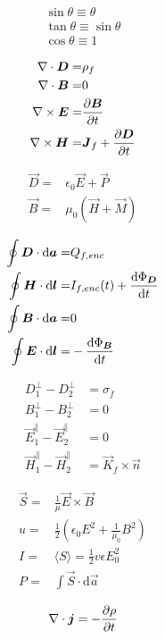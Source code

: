 \begin{align*}
	\sin\theta\equiv\theta\\
	\tan\theta\equiv\sin\theta\\
	\cos\theta\equiv1
\end{align*}

\begin{align*}
    \nabla\cdot\boldsymbol{D} =& \rho_{f} \\
    \nabla\cdot\boldsymbol{B} =& 0 \\
    \nabla \times \boldsymbol{E} =& \frac{\partial \boldsymbol{B}}{\partial t} \\
    \nabla \times \boldsymbol{H} =& \boldsymbol{J}_{f} + \frac{\partial \boldsymbol{D}}{\partial t}
\end{align*}

\begin{align*}
    \vec{D} =& \epsilon_{0}\vec{E} + \vec{P} \\
    \vec{B} =& \mu_{0}(\vec{H} + \vec{M})
\end{align*}

\begin{align*}
    \oint \boldsymbol{D} \cdot \mathrm{d}\boldsymbol{a} =& Q_{f,enc} \\
    \oint \boldsymbol{H} \cdot \mathrm{d}\boldsymbol{l} =& I_{f,enc}(t) + \frac{\mathrm{d} \Phi_{\boldsymbol{D}}}{\mathrm{d} t} \\
    \oint \boldsymbol{B} \cdot \mathrm{d}\boldsymbol{a} =& 0\\
    \oint \boldsymbol{E} \cdot \mathrm{d}\boldsymbol{l} =& - \frac{\mathrm{d} \Phi_{\boldsymbol{B}}}{\mathrm{d} t}
\end{align*}

\begin{align*}
    D_{1}^{\perp} - D_{2}^{\perp} &= \sigma_{f} \\
    B_{1}^{\perp} - B_{2}^{\perp} &= 0 \\
    \vec{E}_{1}^{\parallel} - \vec{E}_{2}^{\parallel} &= 0 \\
    \vec{H}_{1}^{\parallel} - \vec{H}_{2}^{\parallel} &= \vec{K}_f \times \hat{\vec{n}}
\end{align*}

\begin{align*}
    \vec{S} =& \frac{1}{\mu} \vec{E} \times \vec{B} \\
    u =& \frac{1}{2} \left( \epsilon_0 E^{2} + \frac{1}{\mu_0} B^{2} \right) \\
    I =& \langle S \rangle = \frac{1}{2} v\epsilon E_{0}^{2} \\
    P =& \int \vec{S} \cdot \mathrm{d}\vec{a}
\end{align*}

\begin{equation*}
	 \nabla\cdot\boldsymbol{j} = -\frac{\partial \rho}{\partial t}
\end{equation*}


